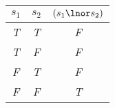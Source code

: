 
\begin{center}
\begin{tabular}{c c||c}
 $s_1$  & $s_2$ & $(s_1 \lnor s_2)$\\
\hline
\emph{T} & \emph{T} & \emph{F} \\
\emph{T} & \emph{F} & \emph{F}  \\
\emph{F} & \emph{T} & \emph{F} \\
\emph{F} & \emph{F} & \emph{T} \\
\end{tabular}
\end{center}

